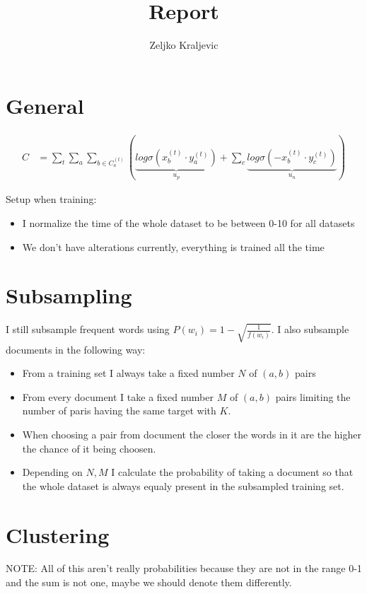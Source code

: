 \documentclass[11pt,a4paper]{article}
\title{Report}
\author{Zeljko Kraljevic}
\begin{document}
\maketitle

\section{General}

\begin{align}
        C &= \sum_{t} \sum_{a} \sum_{b \in C_{a}^{(t)}} \left( \underbrace{log \sigma \left( x_{b}^{(t)} \cdot 
                y_{a}^{(t)} \right)}_{u_p}
                + \sum_{c} \underbrace{log \sigma \left( - x_{b}^{(t)} \cdot y_{c}^{(t)} \right)}_{u_n} \right)
\end{align}

Setup when training:
\begin{itemize}
	\item I normalize the time of the whole dataset to be between 0-10 for all datasets
	\item We don't have alterations currently, everything is trained all the time
\end{itemize} 


\section{Subsampling}
I still subsample frequent words using $P(w_i) = 1 - \sqrt{\frac{1}{f(w_i)}}$. I also subsample documents in the following way:
\begin{itemize}
	\item From a training set I always take a fixed number $N$ of $(a, b)$ pairs
	\item From every document I take a fixed number $M$ of $(a, b)$ pairs limiting the number of paris having the same target with $K$. 
	\item When choosing a pair from document the closer the words in it are the higher the chance of it being choosen.
	\item Depending on $N, M$ I calculate the probability of taking a document so that the whole dataset is always equaly present in the subsampled training set. 
\end{itemize}

\section{Clustering}
NOTE: All of this aren't really probabilities because they are not in the range 0-1 and the sum is not one, maybe we should denote them differently. 
\end{document}
